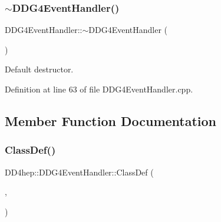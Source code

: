 \hypertarget{class_d_d4hep_1_1_d_d_g4_event_handler_a149942eb56e028c4f5ea9f814e6dbd3b}{}\label{class_d_d4hep_1_1_d_d_g4_event_handler_a149942eb56e028c4f5ea9f814e6dbd3b} 
\subsubsection{\texorpdfstring{$\sim$\+D\+D\+G4\+Event\+Handler()}{~DDG4EventHandler()}}
{\footnotesize\ttfamily D\+D\+G4\+Event\+Handler\+::$\sim$\+D\+D\+G4\+Event\+Handler (\begin{DoxyParamCaption}{ }\end{DoxyParamCaption})\hspace{0.3cm}{\ttfamily [virtual]}}



Default destructor. 



Definition at line 63 of file D\+D\+G4\+Event\+Handler.\+cpp.



\subsection{Member Function Documentation}
\hypertarget{class_d_d4hep_1_1_d_d_g4_event_handler_a0b89e00baf1f1e9a95f4f31517635e34}{}\label{class_d_d4hep_1_1_d_d_g4_event_handler_a0b89e00baf1f1e9a95f4f31517635e34} 
\subsubsection{\texorpdfstring{Class\+Def()}{ClassDef()}}
{\footnotesize\ttfamily D\+D4hep\+::\+D\+D\+G4\+Event\+Handler\+::\+Class\+Def (\begin{DoxyParamCaption}\item[{\hyperlink{class_d_d4hep_1_1_d_d_g4_event_handler}{D\+D\+G4\+Event\+Handler}}]{,  }\item[{0}]{ }\end{DoxyParamCaption})}



